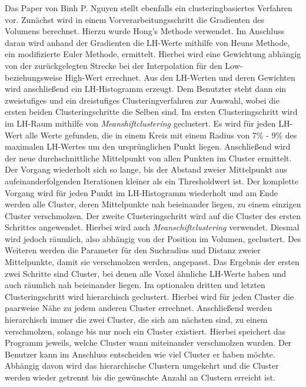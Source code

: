 Das Paper von Binh P. Nguyen \cite{nguyen2012clustering} stellt ebenfalls ein clusteringbasiertes Verfahren vor.
Zunächst wird in einem Vorverarbeitungsschritt die Gradienten des Volumens berechnet. Hierzu wurde Hong's Methode \cite{hong2003method} verwendet.
Im Anschluss daran wird anhand der Gradienten die LH-Werte mithilfe von Heuns Methode, ein modifizierte Euler Methode, ermittelt. Hierbei wird eine Gewichtung abhängig von der zurückgelegten Strecke bei der Interpolation für den Low- beziehungsweise High-Wert errechnet. Aus den LH-Werten und deren Gewichten wird anschließend ein LH-Histogramm erzeugt.
\newline
Dem Benutzter steht dann ein zweistufiges und ein dreistufiges Clusteringverfahren zur Auswahl, wobei die ersten beiden Clusteringschritte die Selben sind. 
Im ersten Clusteringschritt wird im LH-Raum mithilfe von \textit{Meanshiftclustering} geclustert. Es wird für jeden LH-Wert alle Werte gefunden, die in einem Kreis mit einem Radius von 7\% - 9\%  des maximalen LH-Wertes um den ursprünglichen Punkt liegen.
Anschließend wird der neue durchschnittliche Mittelpunkt von allen Punkten im Cluster ermittelt. Der Vorgang wiederholt sich so lange, bis der Abstand zweier Mittelpunkt aus aufeinanderfolgenden Iterationen kleiner als ein Thresholdwert ist.
Der komplette Vorgang wird für jeden Punkt im LH-Histogramm wiederholt und am Ende werden alle Cluster, deren Mittelpunkte nah beieinander liegen, zu einem einzigen Cluster verschmolzen.
\newline
Der zweite Clusteringschritt wird auf die Cluster des ersten Schrittes angewendet. Hierbei wird auch \textit{Meanschiftclustering} verwendet. Diesmal wird jedoch räumlich, also abhängig von der Position im Volumen, geclustert. Des Weiteren werden die Parameter für den Suchradius und Distanz zweier Mittelpunkte, damit sie verschmolzen werden, angepasst.
Das Ergebnis der ersten zwei Schritte sind Cluster, bei denen alle Voxel ähnliche LH-Werte haben und auch räumlich nah beieinander liegen.
\newline
Im optionalen dritten und letzten Clusteringschritt wird hierarchisch geclustert. Hierbei wird für jeden Cluster die paarweise Nähe zu jedem anderen Cluster errechnet.
Anschließend werden hierarchisch immer die zwei Cluster, die sich am nächsten sind, zu einem verschmolzen, solange bis nur noch ein Cluster existiert.
Hierbei speichert das Programm jeweils, welche Cluster wann miteinander verschmolzen wurden. Der Benutzer kann im Anschluss entscheiden wie viel Cluster er haben möchte. Abhängig davon wird das hierarchische Clustern umgekehrt und die Cluster werden wieder getrennt bis die gewünschte Anzahl an Clustern erreicht ist.



